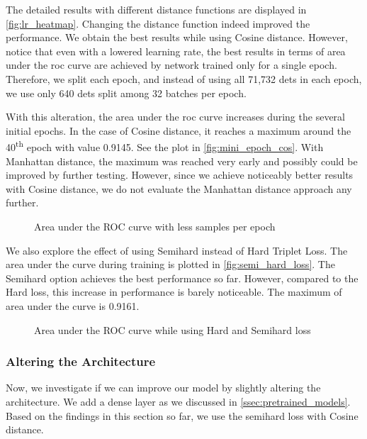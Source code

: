 The detailed results with different distance functions are displayed in \autoref{fig:lr_heatmap}. Changing the distance function indeed improved the performance. We obtain the best results while using Cosine distance. However, notice that even with a lowered learning rate, the best results in terms of area under the \gls{roc} curve are achieved by network trained only for a single epoch. Therefore, we split each epoch, and instead of using all 71,732 \glspl{det} in each epoch, we use only 640 \glspl{det} split among 32 batches per epoch.

With this alteration, the area under the \gls{roc} curve increases during the several initial epochs. In the case of Cosine distance, it reaches a maximum around the 40\textsuperscript{th} epoch with value 0.9145. See the plot in \autoref{fig:mini_epoch_cos}. With Manhattan distance, the maximum was reached very early and possibly could be improved by further testing. However, since we achieve noticeably better results with Cosine distance, we do not evaluate the Manhattan distance approach any further.

\begin{figure}
    \centering
    \def\svgwidth{\columnwidth}
    
    \caption{Area under the ROC curve with less samples per epoch}
    \label{fig:mini_epoch_cos}
\end{figure}

We also explore the effect of using Semihard instead of Hard Triplet Loss. The area under the curve during training is plotted in \autoref{fig:semi_hard_loss}. The Semihard option achieves the best performance so far. However, compared to the Hard loss, this increase in performance is barely noticeable. The maximum of area under the curve is 0.9161.

\begin{figure}
    \centering
    \def\svgwidth{\columnwidth}
    
    \caption{Area under the ROC curve while using Hard and Semihard loss}
    \label{fig:semi_hard_loss}
\end{figure}

\subsubsection{Altering the Architecture}

Now, we investigate if we can improve our model by slightly altering the architecture. We add a dense layer as we discussed in \autoref{ssec:pretrained_models}. Based on the findings in this section so far, we use the semihard loss with Cosine distance.

